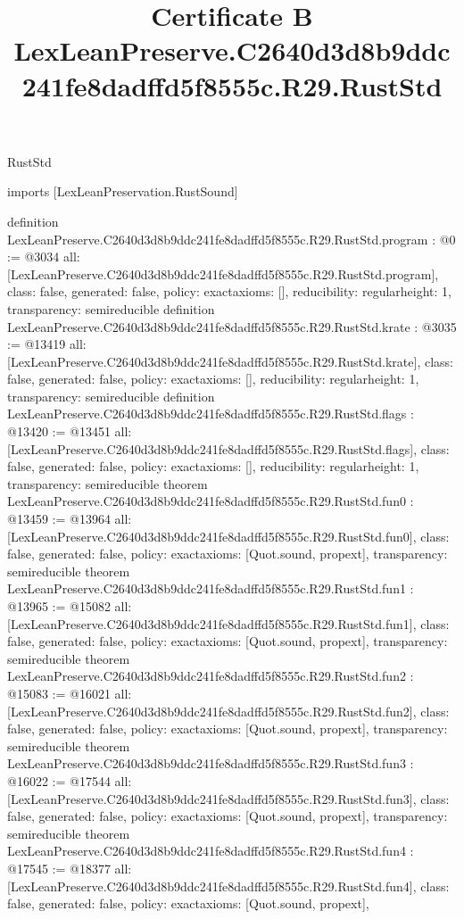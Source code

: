 \begin{lexlean}{RustStd}
\title{Certificate B LexLeanPreserve.C2640d3d8b9ddc241fe8dadffd5f8555c.R29.RustStd}
\begin{coremodule}
imports [LexLeanPreservation.RustSound]

definition LexLeanPreserve.C2640d3d8b9ddc241fe8dadffd5f8555c.R29.RustStd.program : @0 := @3034 {
  all: [LexLeanPreserve.C2640d3d8b9ddc241fe8dadffd5f8555c.R29.RustStd.program],
  class: false,
  generated: false,
  policy: exact{axioms: []},
  reducibility: regular{height: 1},
  transparency: semireducible
}
definition LexLeanPreserve.C2640d3d8b9ddc241fe8dadffd5f8555c.R29.RustStd.krate : @3035 := @13419 {
  all: [LexLeanPreserve.C2640d3d8b9ddc241fe8dadffd5f8555c.R29.RustStd.krate],
  class: false,
  generated: false,
  policy: exact{axioms: []},
  reducibility: regular{height: 1},
  transparency: semireducible
}
definition LexLeanPreserve.C2640d3d8b9ddc241fe8dadffd5f8555c.R29.RustStd.flags : @13420 := @13451 {
  all: [LexLeanPreserve.C2640d3d8b9ddc241fe8dadffd5f8555c.R29.RustStd.flags],
  class: false,
  generated: false,
  policy: exact{axioms: []},
  reducibility: regular{height: 1},
  transparency: semireducible
}
theorem LexLeanPreserve.C2640d3d8b9ddc241fe8dadffd5f8555c.R29.RustStd.fun0 : @13459 := @13964 {
  all: [LexLeanPreserve.C2640d3d8b9ddc241fe8dadffd5f8555c.R29.RustStd.fun0],
  class: false,
  generated: false,
  policy: exact{axioms: [Quot.sound, propext]},
  transparency: semireducible
}
theorem LexLeanPreserve.C2640d3d8b9ddc241fe8dadffd5f8555c.R29.RustStd.fun1 : @13965 := @15082 {
  all: [LexLeanPreserve.C2640d3d8b9ddc241fe8dadffd5f8555c.R29.RustStd.fun1],
  class: false,
  generated: false,
  policy: exact{axioms: [Quot.sound, propext]},
  transparency: semireducible
}
theorem LexLeanPreserve.C2640d3d8b9ddc241fe8dadffd5f8555c.R29.RustStd.fun2 : @15083 := @16021 {
  all: [LexLeanPreserve.C2640d3d8b9ddc241fe8dadffd5f8555c.R29.RustStd.fun2],
  class: false,
  generated: false,
  policy: exact{axioms: [Quot.sound, propext]},
  transparency: semireducible
}
theorem LexLeanPreserve.C2640d3d8b9ddc241fe8dadffd5f8555c.R29.RustStd.fun3 : @16022 := @17544 {
  all: [LexLeanPreserve.C2640d3d8b9ddc241fe8dadffd5f8555c.R29.RustStd.fun3],
  class: false,
  generated: false,
  policy: exact{axioms: [Quot.sound, propext]},
  transparency: semireducible
}
theorem LexLeanPreserve.C2640d3d8b9ddc241fe8dadffd5f8555c.R29.RustStd.fun4 : @17545 := @18377 {
  all: [LexLeanPreserve.C2640d3d8b9ddc241fe8dadffd5f8555c.R29.RustStd.fun4],
  class: false,
  generated: false,
  policy: exact{axioms: [Quot.sound, propext]},
}
\end{coremodule}
\end{lexlean}
